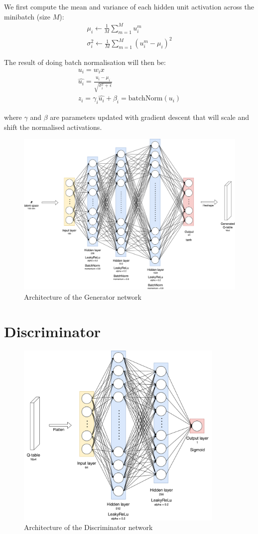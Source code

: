 We first compute the mean and variance of each hidden unit activation across the minibatch (size $M$):
\begin{gather*}
\mu_i \leftarrow \frac{1}{M} \sum_{m=1}^{M}u_i^m \\
\sigma_i^2 \leftarrow \frac{1}{M} \sum_{m=1}^{M}(u_i^m - \mu_i)^2
\end{gather*}

The result of doing batch normalisation will then be:
\begin{gather*}
u_i = w_ix \\
\hat{u_i} = \frac{u_i-\mu_i}{\sqrt{\sigma_i^2 + \epsilon}} \\
z_i = \gamma_i\hat{u_i}+\beta_i = \text{batchNorm}({u_i})
\end{gather*}

where $\gamma$ and $\beta$ are parameters updated with gradient descent that will scale and shift the normalised activations.


\begin{figure}
\centering
\includegraphics[width=15cm]{Figures/Generator}
\caption{Architecture of the Generator network}
\label{fig:Generator}
\end{figure}


\section{Discriminator}
\begin{figure}
\centering
\includegraphics[width=10cm]{Figures/Discriminator}
\caption{Architecture of the Discriminator network}
\label{fig:Discriminator}
\end{figure}
